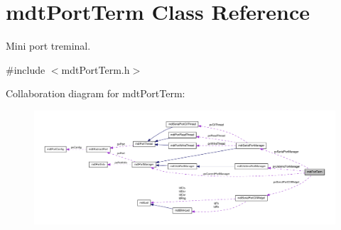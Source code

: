 \hypertarget{classmdt_port_term}{
\section{mdtPortTerm Class Reference}
\label{classmdt_port_term}
}


Mini port treminal.  




{\ttfamily \#include $<$mdtPortTerm.h$>$}



Collaboration diagram for mdtPortTerm:
\nopagebreak
\begin{figure}[H]
\begin{center}
\leavevmode
\includegraphics[width=400pt]{classmdt_port_term__coll__graph}
\end{center}
\end{figure}
